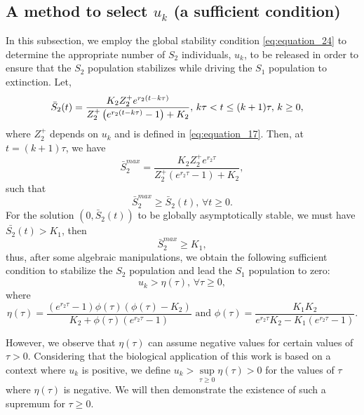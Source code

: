 \documentclass[10pt,letterpaper]{article}
\begin{document}
\subsection{A method to select $u_k$ (a sufficient condition)}
In this subsection, we employ the global stability condition \eqref{eq:equation_24} to determine the appropriate number of $S_2$ individuals, $u_k$, to be released in order to ensure that the $S_2$ population stabilizes while driving the $S_1$ population to extinction. Let,
\begin{align}\label{eq:equation_40}
    \Bar{S}_2(t) &= \dfrac{K_2 Z_{2}^{+} e^{r_2 (t-k\tau)}}{Z_{2}^{+}\left(e^{r_2 (t-k\tau)} -1\right)+K_2}, \,  k\tau < t \leq (k+1)\tau, \,k \geq 0,
\end{align} where $Z_2^+$ depends on $u_k$ and is defined in \eqref{eq:equation_17}. Then, at $t = (k+1)\tau$, we have
\begin{equation}\label{eq:equation_41}
    \bar{S}_2^{max} = \dfrac{K_2 Z_{2}^{+} e^{r_2 \tau}}{Z_{2}^{+}\left(e^{r_2\tau} -1\right)+K_2},
\end{equation}such that
\begin{equation}\label{eq:equation_42}
    \bar{S}_2^{max} \geq \bar{S}_2(t), \, \forall t \geq 0.
\end{equation} For the solution $(0,\bar{S}_2(t))$ to be globally asymptotically stable, we must have $\bar{S_2}(t)>K_1$, then 
\begin{equation}\label{eq:equation_43}
    \bar{S}_2^{max}  \geq K_1,
\end{equation}
thus, after some algebraic manipulations, we obtain the following sufficient condition to stabilize the $S_2$ population and lead the $S_1$ population to zero:
\begin{equation}\label{eq:equation_44}%
    u_k> \eta(\tau),\, \forall \tau \geq 0,
\end{equation}where 
\begin{equation}\label{eq:equation_45}
    \eta(\tau) = \frac{(e^{r_2 \tau}-1)\phi(\tau)(\phi(\tau)-K_2)}{K_2 + \phi(\tau)(e^{r_2 \tau}-1)} \text{ and } \phi(\tau) = \frac{K_1 K_2}{e^{r_2 \tau} K_2 - K_1(e^{r_2 \tau}-1)}.
\end{equation}

However, we observe that $\eta(\tau)$ can assume negative values for certain values of $\tau > 0$. Considering that the biological application of this work is based on a context where $u_k$ is positive, we define $u_k > \sup\limits_{\tau \geq 0} \eta(\tau) > 0$ for the values of $\tau$ where $\eta(\tau)$ is negative. We will then demonstrate the existence of such a supremum for $\tau \geq 0$.
\end{document}
